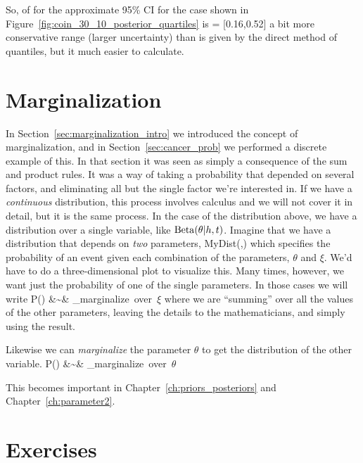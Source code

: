 So, of for the approximate 95\% CI for the case shown in Figure~\ref{fig:coin_30_10_posterior_quartiles} is
 = [0.16,0.52]
\eeqn
a bit more conservative range (larger uncertainty) than is given by the direct method of quantiles, but it much easier to calculate.

\section{Marginalization}

In Section~\ref{sec:marginalization_intro} we introduced the concept of marginalization, and in Section~\ref{sec:cancer_prob} we performed a discrete example of this.  In that section it was seen as simply a consequence of the sum and product rules.  It was a way of taking a probability that depended on several factors, and eliminating all but the single factor we're interested in.  If we have a {\em continuous} distribution, this process involves calculus and we will not cover it in detail, but it is the same process.  In the case of the distribution above, we have a distribution over a single variable, like ${\rm Beta}(\theta|h,t)$.  Imagine that we have a distribution that depends on {\em two} parameters, 
\beqn
{\rm MyDist}(\theta,\xi)
\eeqn
which specifies the probability of an event given each combination of the parameters, $\theta$ and $\xi$.  We'd have to do a three-dimensional plot to visualize this.  Many times, however, we want just the probability of one of the single parameters.  In those cases we will write
\beqn
P(\theta) &\sim& _{\mbox{\scriptsize marginalize over $\xi$}} 
\eeqn
where we are ``summing'' over all the values of the other parameters, leaving the details to the mathematicians, and simply using the result.  

Likewise we can {\em marginalize} the parameter $\theta$ to get the distribution of the other variable.  
\beqn
P(\xi) &\sim& _{\mbox{\scriptsize marginalize over $\theta$}} 
\eeqn



This becomes important in Chapter~\ref{ch:priors_posteriors} and Chapter~\ref{ch:parameter2}.


\section{Exercises}



